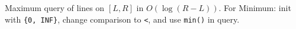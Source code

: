 
Maximum query of lines on $[L, R]$ in $O(\log(R - L))$. For Minimum: init with \lstinline|{0, INF}|, change comparison to \lstinline|<|, and use \lstinline|min()| in query.



